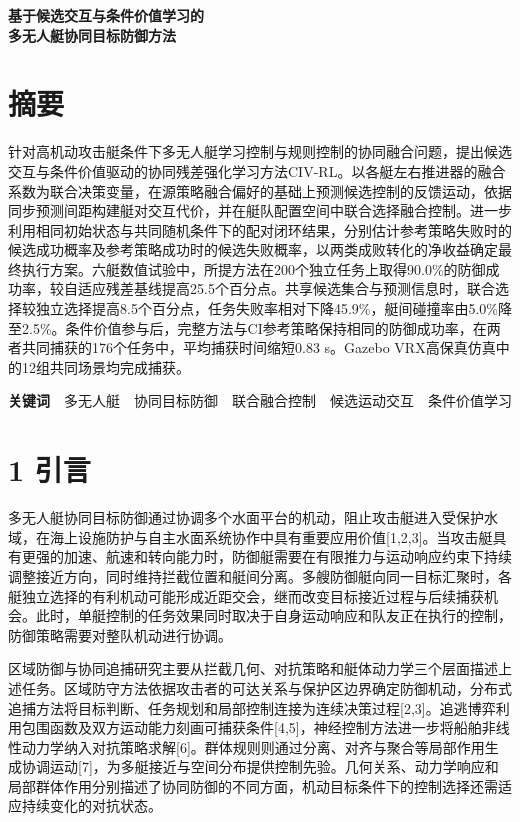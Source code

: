 \documentclass[UTF8,a4paper,zihao=5,fontset=none]{ctexart}
\begin{document}
\begin{center}\sffamily\bfseries\fontsize{18}{25}\selectfont
基于候选交互与条件价值学习的\\多无人艇协同目标防御方法
\end{center}\vspace{3pt}

\section*{摘要}

针对高机动攻击艇条件下多无人艇学习控制与规则控制的协同融合问题，提出候选交互与条件价值驱动的协同残差强化学习方法CIV-RL。以各艇左右推进器的融合系数为联合决策变量，在源策略融合偏好的基础上预测候选控制的反馈运动，依据同步预测间距构建艇对交互代价，并在艇队配置空间中联合选择融合控制。进一步利用相同初始状态与共同随机条件下的配对闭环结果，分别估计参考策略失败时的候选成功概率及参考策略成功时的候选失败概率，以两类成败转化的净收益确定最终执行方案。六艇数值试验中，所提方法在200个独立任务上取得90.0\%的防御成功率，较自适应残差基线提高25.5个百分点。共享候选集合与预测信息时，联合选择较独立选择提高8.5个百分点，任务失败率相对下降45.9\%，艇间碰撞率由5.0\%降至2.5\%。条件价值参与后，完整方法与CI参考策略保持相同的防御成功率，在两者共同捕获的176个任务中，平均捕获时间缩短0.83 s。Gazebo VRX高保真仿真中的12组共同场景均完成捕获。

\textbf{关键词}　多无人艇　协同目标防御　联合融合控制　候选运动交互　条件价值学习

\section*{1 引言}

多无人艇协同目标防御通过协调多个水面平台的机动，阻止攻击艇进入受保护水域，在海上设施防护与自主水面系统协作中具有重要应用价值{[}1,2,3{]}。当攻击艇具有更强的加速、航速和转向能力时，防御艇需要在有限推力与运动响应约束下持续调整接近方向，同时维持拦截位置和艇间分离。多艘防御艇向同一目标汇聚时，各艇独立选择的有利机动可能形成近距交会，继而改变目标接近过程与后续捕获机会。此时，单艇控制的任务效果同时取决于自身运动响应和队友正在执行的控制，防御策略需要对整队机动进行协调。

区域防御与协同追捕研究主要从拦截几何、对抗策略和艇体动力学三个层面描述上述任务。区域防守方法依据攻击者的可达关系与保护区边界确定防御机动，分布式追捕方法将目标判断、任务规划和局部控制连接为连续决策过程{[}2,3{]}。追逃博弈利用包围函数及双方运动能力刻画可捕获条件{[}4,5{]}，神经控制方法进一步将船舶非线性动力学纳入对抗策略求解{[}6{]}。群体规则则通过分离、对齐与聚合等局部作用生成协调运动{[}7{]}，为多艇接近与空间分布提供控制先验。几何关系、动力学响应和局部群体作用分别描述了协同防御的不同方面，机动目标条件下的控制选择还需适应持续变化的对抗状态。
\end{document}
